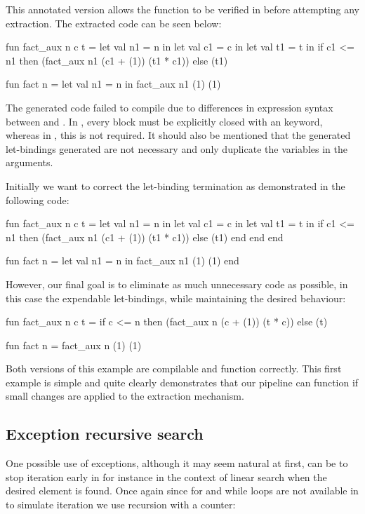 This annotated version allows the function to be verified in \whythree before attempting any extraction. The extracted code can be
seen below:

\begin{cakeml}
fun fact_aux n c t = let val n1 = n in
  let val c1 = c in
  let val t1 = t in
  if c1 <= n1 then (fact_aux n1 (c1 + (1)) (t1 * c1))  else (t1)

fun fact n = let val n1 = n in fact_aux n1 (1) (1)
\end{cakeml}

The generated \cml code failed to compile due to differences in  expression syntax between \ocaml and \cml. In \cml, every 
 block must be explicitly closed with an  keyword, whereas in \ocaml, this is not required. It should
also be mentioned that the generated let-bindings generated are not necessary and only duplicate the variables in the arguments.

Initially we want to correct the let-binding termination as demonstrated in the following code:

\begin{cakeml}
fun fact_aux n c t = let val n1 = n in
  let val c1 = c in
  let val t1 = t in
  if c1 <= n1 then (fact_aux n1 (c1 + (1)) (t1 * c1))  else (t1)
  end end end

fun fact n = let val n1 = n in fact_aux n1 (1) (1) end
\end{cakeml}

However, our final goal is to eliminate as much unnecessary code as possible, in this case the expendable let-bindings, while 
maintaining the desired behaviour:

\begin{cakeml}
fun fact_aux n c t = 
  if c <= n then (fact_aux n (c + (1)) (t * c))  else (t)

fun fact n = fact_aux n (1) (1)
\end{cakeml}

Both versions of this example are compilable and function correctly. This first example is simple and quite clearly demonstrates that
our pipeline can function if small changes are applied to the extraction mechanism.

\subsection{Exception recursive search}

One possible use of exceptions, although it may seem natural at first, can be to stop iteration early in \ocaml for instance in the 
context of linear search when the desired element is found. Once again since for and while loops are not available in \cml to simulate 
iteration we use recursion with a counter:

